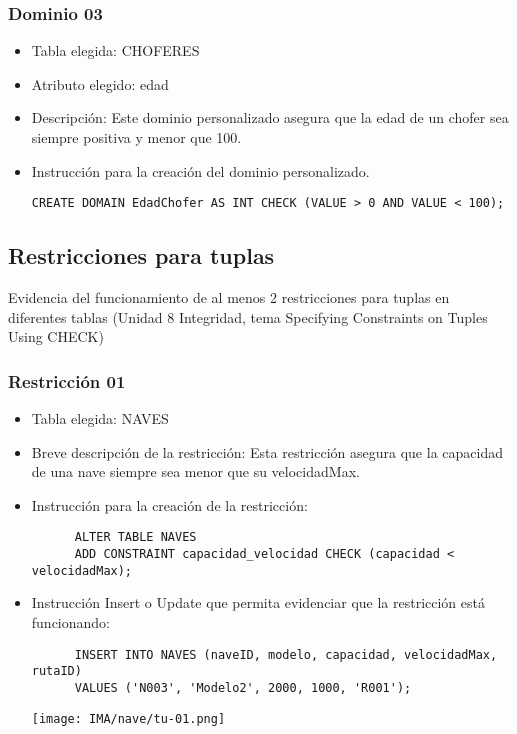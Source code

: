 \subsubsection*{Dominio 03}

\begin{itemize} 
  \item Tabla elegida: CHOFERES 
  \item Atributo elegido: edad 
  \item Descripción: Este dominio personalizado asegura que la edad de un chofer sea siempre positiva y menor que 100. 
  \item Instrucción para la creación del dominio personalizado. 
    \begin{lstlisting}[caption={Dominio 03}, label={lst:sql_estadios}] 
      CREATE DOMAIN EdadChofer AS INT CHECK (VALUE > 0 AND VALUE < 100); 
    \end{lstlisting} 
\end{itemize}



\subsection{Restricciones para tuplas}

Evidencia del funcionamiento de al menos 2 restricciones para tuplas en diferentes tablas (Unidad 8 Integridad, tema Specifying Constraints on Tuples Using CHECK)


\subsubsection*{Restricción 01}

\begin{itemize} 
  \item Tabla elegida: NAVES 
  \item Breve descripción de la restricción: Esta restricción asegura que la capacidad de una nave siempre sea menor que su velocidadMax. 
  \item Instrucción para la creación de la restricción: 
    \begin{verbatim} 
      ALTER TABLE NAVES 
      ADD CONSTRAINT capacidad_velocidad CHECK (capacidad < velocidadMax); 
    \end{verbatim} 
  \item Instrucción Insert o Update que permita evidenciar que la restricción está funcionando: 
    \begin{verbatim} 
      INSERT INTO NAVES (naveID, modelo, capacidad, velocidadMax, rutaID) 
      VALUES ('N003', 'Modelo2', 2000, 1000, 'R001'); 
    \end{verbatim}
    \begin{center}
      \texttt{[image: IMA/nave/tu-01.png]}
    \end{center}
\end{itemize}


